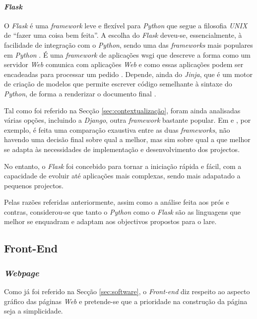 \paragraph{\textit{Flask}}
O \textit{Flask} é uma \textit{framework} leve e flexível para \textit{Python} que segue a filosofia \textit{UNIX} de ``fazer uma coisa bem feita''. A escolha do \textit{Flask} deveu-se, essencialmente, à facilidade de integração com o \textit{Python}, sendo uma das \textit{frameworks} mais populares em \textit{Python} \cite{Flask}. É uma \textit{framework} de aplicações \acrfull{wsgi} que descreve a forma como um servidor \textit{Web} comunica com aplicações \textit{Web} e como essas aplicações podem ser encadeadas para processar um pedido \cite{wsgi}. Depende, ainda do  \textit{Jinja}, que é um motor de criação de modelos que permite escrever código semelhante à sintaxe do \textit{Python}, de forma a renderizar o documento final \cite{Jinja}.

Tal como foi referido na Secção \ref{sec:contextualização}, foram ainda analisadas várias opções, incluindo a \textit{Django}, outra \textit{framework} bastante popular. Em \cite{Djangovsflask} e \cite{FlaskvsDjango}, por exemplo, é feita uma comparação exaustiva entre as duas \textit{frameworks}, não havendo uma decisão final sobre qual a melhor, mas sim sobre qual a que melhor se adapta às necessidades de implementação e desenvolvimento dos projectos.

No entanto, o \textit{Flask} foi concebido para tornar a iniciação rápida e fácil, com a capacidade de evoluir até aplicações mais complexas, sendo mais adapatado a pequenos projectos.

Pelas razões referidas anteriormente, assim como a análise feita aos prós e contras, considerou-se que tanto o \textit{Python} como o \textit{Flask} são as linguagens que melhor se enquadram e adaptam aos objectivos propostos para o \acrshort{lare}.

\subsection{Front-End}
\subsubsection{\textit{Webpage}}
Como já foi referido na Secção \ref{sec:software}, o \textit{Front-end} diz respeito ao aspecto gráfico das páginas \textit{Web} e pretende-se que a prioridade na construção da página seja a simplicidade.

